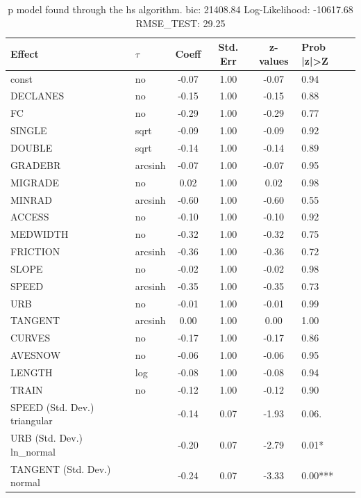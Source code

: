 \begin{table}
	\caption{p model found through the hs algorithm. bic: 21408.84 Log-Likelihood: -10617.68 RMSE_TEST: 29.25}
	\begin{center}
		\begin{tabular}{|l|l|c|c|c|l|}
			\hline
			Effect & $\tau$ & Coeff & Std. Err & z-values & Prob |z|>Z \\
			\hline
			const & no & -0.07 & 1.00 & -0.07 & 0.94 \\
			\hline
			DECLANES & no & -0.15 & 1.00 & -0.15 & 0.88 \\
			\hline
			FC & no & -0.29 & 1.00 & -0.29 & 0.77 \\
			\hline
			SINGLE & sqrt & -0.09 & 1.00 & -0.09 & 0.92 \\
			\hline
			DOUBLE & sqrt & -0.14 & 1.00 & -0.14 & 0.89 \\
			\hline
			GRADEBR & arcsinh & -0.07 & 1.00 & -0.07 & 0.95 \\
			\hline
			MIGRADE & no & 0.02 & 1.00 & 0.02 & 0.98 \\
			\hline
			MINRAD & arcsinh & -0.60 & 1.00 & -0.60 & 0.55 \\
			\hline
			ACCESS & no & -0.10 & 1.00 & -0.10 & 0.92 \\
			\hline
			MEDWIDTH & no & -0.32 & 1.00 & -0.32 & 0.75 \\
			\hline
			FRICTION & arcsinh & -0.36 & 1.00 & -0.36 & 0.72 \\
			\hline
			SLOPE & no & -0.02 & 1.00 & -0.02 & 0.98 \\
			\hline
			SPEED & arcsinh & -0.35 & 1.00 & -0.35 & 0.73 \\
			\hline
			URB & no & -0.01 & 1.00 & -0.01 & 0.99 \\
			\hline
			TANGENT & arcsinh & 0.00 & 1.00 & 0.00 & 1.00 \\
			\hline
			CURVES & no & -0.17 & 1.00 & -0.17 & 0.86 \\
			\hline
			AVESNOW & no & -0.06 & 1.00 & -0.06 & 0.95 \\
			\hline
			LENGTH & log & -0.08 & 1.00 & -0.08 & 0.94 \\
			\hline
			TRAIN & no & -0.12 & 1.00 & -0.12 & 0.90 \\
			\hline
			SPEED (Std. Dev.) triangular &  & -0.14 & 0.07 & -1.93 & 0.06. \\
			\hline
			URB (Std. Dev.) ln_normal &  & -0.20 & 0.07 & -2.79 & 0.01* \\
			\hline
			TANGENT (Std. Dev.) normal &  & -0.24 & 0.07 & -3.33 & 0.00*** \\

\end{tabular}
\end{center}
\end{table}
